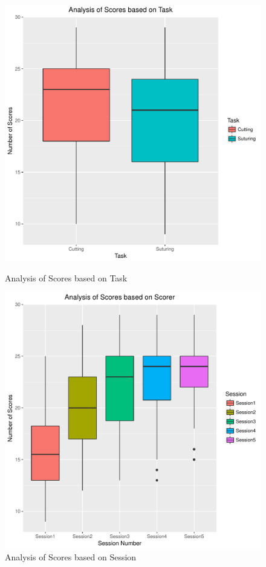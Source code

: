 \documentclass[12pt,epsf]{report}
\begin{document}
\begin{figure}[!htb]
	\begin{minipage}[c]{0.5\linewidth}
	\includegraphics[width=\linewidth]{TaskVsScore.pdf}
	\caption{Analysis of Scores based on Task}
	\end{minipage}
	\hfill
	\begin{minipage}[c]{0.5\linewidth}
	\includegraphics[width=\linewidth]{SessionVsScore.pdf}
	\caption{Analysis of Scores based on Session}
	\end{minipage}
\end{figure}\\
\end{document}
